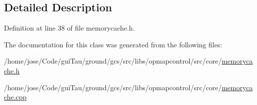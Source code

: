 \subsection{Detailed Description}


Definition at line 38 of file memorycache.\-h.



The documentation for this class was generated from the following files\-:\begin{DoxyCompactItemize}
\item 
/home/jose/\-Code/gui\-Tau/ground/gcs/src/libs/opmapcontrol/src/core/\hyperlink{memorycache_8h}{memorycache.\-h}\item 
/home/jose/\-Code/gui\-Tau/ground/gcs/src/libs/opmapcontrol/src/core/\hyperlink{memorycache_8cpp}{memorycache.\-cpp}\end{DoxyCompactItemize}
